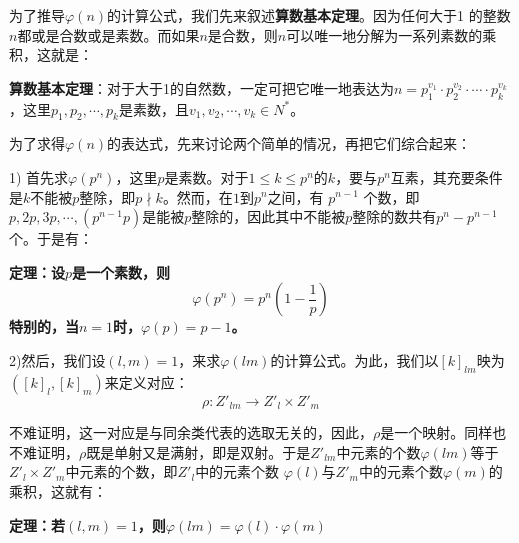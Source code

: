 \documentclass[12pt]{article}
\begin{document}
为了推导$\varphi(n)$的计算公式，我们先来叙述\textbf{算数基本定理}。因为任何大于1 的整数$n$都或是合数或是素数。而如果$n$是合数，则$n$可以唯一地分解为一系列素数的乘积，这就是：

\begin{mdframed}[
linecolor=black!40,outerlinewidth=1pt,roundcorner=.5em,innertopmargin=1ex,innerbottommargin=.5\baselineskip,innerrightmargin=1em,innerleftmargin=1em,backgroundcolor=gray!5,
]
\textbf{算数基本定理}：对于大于1的自然数，一定可把它唯一地表达为$n = p_1^{v_1} \cdot p_2^{v_2} \cdot \cdots \cdot p_k^{v_k}$，这里$p_1, p_2, \cdots, p_k$是素数，且$v_1, v_2, \cdots, v_k \in N^*$。
\end{mdframed}

为了求得$\varphi(n)$的表达式，先来讨论两个简单的情况，再把它们综合起来：

1) 首先求$\varphi(p^n)$，这里$p$是素数。对于$1 \le k \le p^n$的$k$，要与$p^n$互素，其充要条件是$k$不能被$p$整除，即$p \nmid k$。然而，在$1$到$p^n$之间，有 $p^{n-1}$ 个数，即$p, 2p, 3p, \cdots, (p^{n-1}p)$是能被$p$整除的，因此其中不能被$p$整除的数共有$p^n - p^{n-1}$个。于是有：

\begin{mdframed}[
linecolor=black!40,outerlinewidth=1pt,roundcorner=.5em,innertopmargin=1ex,innerbottommargin=.5\baselineskip,innerrightmargin=1em,innerleftmargin=1em,backgroundcolor=gray!5,
]
\textbf{定理：设$p$是一个素数，则
$$
\varphi(p^n) = p^n(1 - \frac{1}{p})
$$
特别的，当$n=1$时，$\varphi(p) = p - 1$。}
\end{mdframed}

2)然后，我们设$(l,m)=1$，来求$\varphi(lm)$的计算公式。为此，我们以$[k]_{lm}$映为$([k]_l, [k]_m)$来定义对应：
$$
\rho: Z'_{lm} \rightarrow Z'_l \times Z'_m
$$

不难证明，这一对应是与同余类代表的选取无关的，因此，$\rho$是一个映射。同样也不难证明，$\rho$既是单射又是满射，即是双射。于是$Z'_{lm}$中元素的个数$\varphi(lm)$等于$Z'_l \times Z'_m$中元素的个数，即$Z'_l$中的元素个数
$\varphi(l)$与$Z'_m$中的元素个数$\varphi(m)$的乘积，这就有：

\begin{mdframed}[
linecolor=black!40,outerlinewidth=1pt,roundcorner=.5em,innertopmargin=1ex,innerbottommargin=.5\baselineskip,innerrightmargin=1em,innerleftmargin=1em,backgroundcolor=gray!5,
]
\textbf{
定理：若$(l,m) = 1$，则$\varphi(lm) = \varphi(l) \cdot  \varphi(m)$
}
\end{mdframed}
\end{document}
